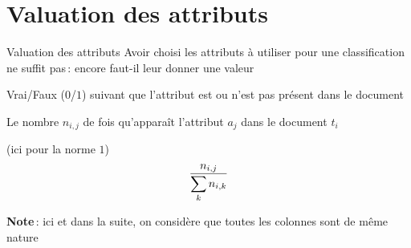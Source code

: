 \documentclass[xcolor={svgnames}, french]{beamer}
\begin{document}
\section{Valuation des attributs}
\begin{frame}[label=attrval]{Valuation des attributs}
	Avoir choisi les attributs à utiliser pour une classification ne suffit pas : encore faut-il leur donner une \alert{valeur}
	\pause
	\begin{description}[*]
		\item<+->[Booléenne] Vrai/Faux ($0$/$1$) suivant que l'attribut est ou n'est pas présent dans le document
		\item<+->[Occurrences] Le nombre $n_{i,j}$ de fois qu'apparaît l'attribut $a_j$ dans le document $t_i$
		\item<+->[Fréquences normalisées par ligne] (ici pour la norme $1$)
			\begin{equation}
				\frac{\mathnode{freqfracnum}{n_{i,j}}}{\mathnode{freqfracden}{\sum_k n_{i,k}}}
			\end{equation}
	\end{description}
	\pause
	\textbf{Note} : ici et dans la suite, on considère que toutes les colonnes sont de même nature
\end{frame}
\end{document}
